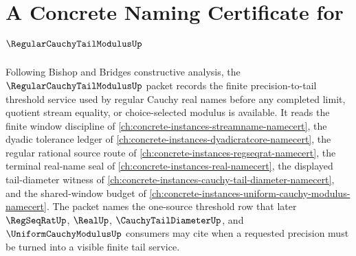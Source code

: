 \chapter{A Concrete Naming Certificate for $\RegularCauchyTailModulusUp$}
\label{ch:concrete-instances-regular-cauchy-tail-modulus-namecert}

Following Bishop and Bridges constructive analysis, the $\RegularCauchyTailModulusUp$ packet records the finite precision-to-tail threshold service used by regular Cauchy real names before any completed limit, quotient stream equality, or choice-selected modulus is available. It reads the finite window discipline of \autoref{ch:concrete-instances-streamname-namecert}, the dyadic tolerance ledger of \autoref{ch:concrete-instances-dyadicratcore-namecert}, the regular rational source route of \autoref{ch:concrete-instances-regseqrat-namecert}, the terminal real-name seal of \autoref{ch:concrete-instances-real-namecert}, the displayed tail-diameter witness of \autoref{ch:concrete-instances-cauchy-tail-diameter-namecert}, and the shared-window budget of \autoref{ch:concrete-instances-uniform-cauchy-modulus-namecert}. The packet names the one-source threshold row that later $\RegSeqRatUp$, $\RealUp$, $\CauchyTailDiameterUp$, and $\UniformCauchyModulusUp$ consumers may cite when a requested precision must be turned into a visible finite tail service.

